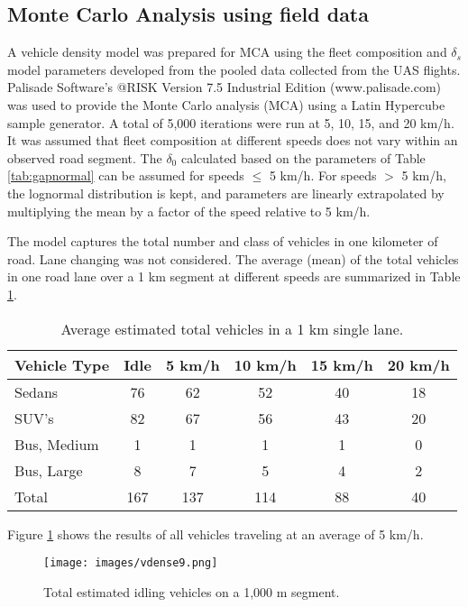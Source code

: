 \documentclass[preprint,12pt,a4paper]{elsarticle}
\begin{document}
\begin{linenumbers}
\subsection{Monte Carlo Analysis using field data}
A vehicle density model was prepared for MCA using the fleet composition and $\delta_{s}$ model parameters developed from the pooled data collected from the UAS flights. Palisade Software’s @RISK Version 7.5 Industrial Edition (www.palisade.com) was used to provide the Monte Carlo analysis (MCA) using a Latin Hypercube sample generator.  A total of 5,000 iterations were run at 5, 10, 15, and 20 km/h. It was assumed that fleet composition at different speeds does not vary within an observed road segment. The $\delta_{0}$ calculated based on the parameters of Table \ref{tab:gapnormal} can be assumed for speeds $\leq$ 5 km/h. For speeds $>$ 5 km/h, the lognormal distribution is kept, and parameters are linearly extrapolated by multiplying the mean by a factor of the speed relative to 5 km/h.  

The model captures the total number and class of vehicles in one kilometer of road.  Lane changing was not considered. The average (mean) of the total vehicles in one road lane over a 1 km segment at different speeds are summarized in Table \ref{tab:meanvehdensity}.

\begin{table}[H]
\centering
\caption{Average estimated total vehicles in a 1 km single lane.}
\label{tab:meanvehdensity}
\begin{tabular}{@{}lccccc@{}}
\toprule
\textbf{Vehicle Type} & \textbf{Idle} & \textbf{5 km/h} & \textbf{10 km/h} & \textbf{15 km/h} & \textbf{20 km/h} \\ \midrule
Sedans & 76 & 62 & 52 & 40 & 18 \\
SUV's & 82 & 67 & 56 & 43 & 20 \\
Bus, Medium & 1 & 1 & 1 & 1 & 0 \\
Bus, Large & 8 & 7 & 5 & 4 & 2 \\
Total & 167 & 137 & 114 & 88 & 40 \\ \bottomrule
\end{tabular}
\end{table}

Figure \ref{fig6:estimatedobs} shows the results of all vehicles traveling at an average of 5 km/h.
 
%
\begin{figure}[H]
\texttt{[image: images/vdense9.png]} 
\caption{Total estimated idling vehicles on a 1,000 m segment.}
\label{fig6:estimatedobs}
\end{figure}
%


\end{linenumbers}
\end{document}
